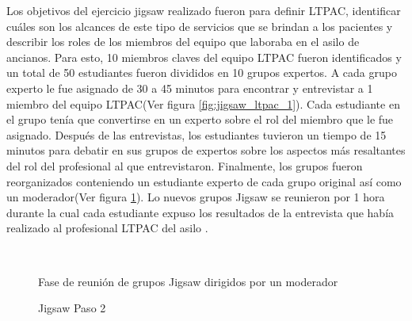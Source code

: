 Los objetivos del ejercicio jigsaw realizado fueron para definir LTPAC, identificar cuáles son los alcances de este tipo de servicios que se brindan a los pacientes y describir los roles de los miembros del equipo que laboraba en el asilo de ancianos. Para esto, 10 miembros claves del equipo LTPAC fueron identificados y un total de 50 estudiantes fueron divididos en 10 grupos expertos. A cada grupo experto le fue asignado de 30 a 45 minutos para encontrar y entrevistar a 1 miembro del equipo LTPAC(Ver figura \ref{fig:jigsaw_ltpac_1}). Cada estudiante en el grupo tenía que convertirse en un experto sobre el rol del miembro que le fue asignado. Después de las entrevistas, los estudiantes tuvieron un tiempo de 15 minutos para debatir en sus grupos de expertos sobre los aspectos más resaltantes del rol del profesional al que entrevistaron. Finalmente, los grupos fueron reorganizados conteniendo un estudiante experto de cada grupo original así como un moderador(Ver figura \ref{fig:jigsaw_ltpac_2}). Lo nuevos grupos Jigsaw se reunieron por 1 hora durante la cual cada estudiante expuso los resultados de la entrevista que había realizado al profesional LTPAC del asilo \cite{Buhr2014429}.\\

\begin{figure}[!h]
  \centering
  \\
  \caption{Jigsaw Paso 2}{Fase de reunión de grupos Jigsaw dirigidos por un moderador \protect\cite{Buhr2014429} }
  \label{fig:jigsaw_ltpac_2}
\end{figure}

